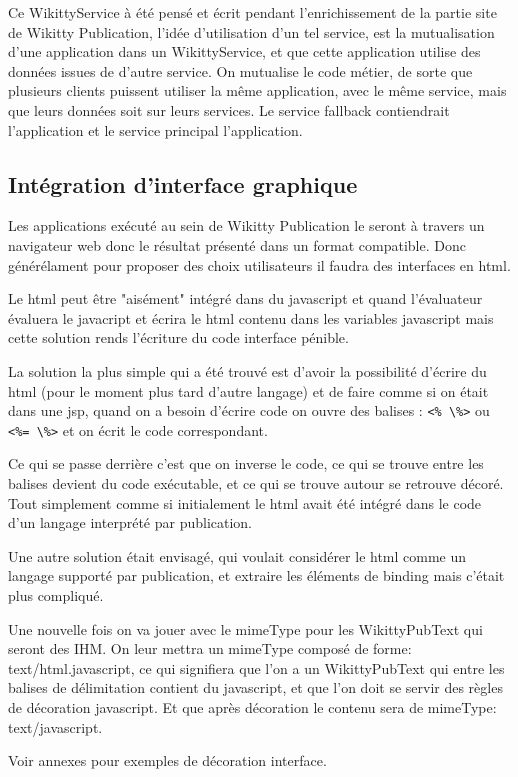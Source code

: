 Ce WikittyService à été pensé et écrit pendant l'enrichissement de la partie 
site de Wikitty Publication, l'idée d'utilisation d'un tel service, est la 
mutualisation d'une application dans un WikittyService, et que cette 
application utilise des données issues de d'autre service. On mutualise le code 
métier, de sorte que plusieurs clients puissent utiliser la même application, 
avec le même service, mais que leurs données soit sur leurs services.
Le service fallback contiendrait l'application et le service principal 
l'application.

\subsection{Intégration d'interface graphique}

Les applications exécuté au sein de Wikitty Publication le seront à travers 
un navigateur web donc le résultat présenté dans un format compatible.
Donc générélament pour proposer des choix utilisateurs il faudra des interfaces
en html.

Le html peut être "aisément" intégré dans du javascript et quand l'évaluateur
évaluera le javacript et écrira le html contenu dans les variables javascript
mais cette solution rends l'écriture du code interface pénible.

La solution la plus simple qui a été trouvé est d'avoir la possibilité d'écrire 
du html (pour le moment plus tard d'autre langage) et de faire comme si on était
dans une jsp, quand on a besoin d'écrire code on ouvre des balises : \verb!<% \%>!
ou \verb!<%= \%>! et on écrit le code correspondant.

Ce qui se passe derrière c'est que on inverse le code, ce qui se trouve entre
les balises devient du code exécutable, et ce qui se trouve autour se retrouve
décoré. Tout simplement comme si initialement le html avait été intégré dans
le code d'un langage interprété par publication.

Une autre solution était envisagé, qui voulait considérer le html comme un langage
supporté par publication, et extraire les éléments de binding mais c'était plus 
compliqué.

Une nouvelle fois on va jouer avec le mimeType pour les WikittyPubText qui 
seront des IHM. On leur mettra un mimeType composé de forme: text/html.javascript,
ce qui signifiera que l'on a un WikittyPubText qui entre les balises de délimitation
contient du javascript, et que l'on doit se servir des règles de décoration javascript.
Et que après décoration le contenu sera de mimeType: text/javascript.

Voir annexes pour exemples de décoration interface.
